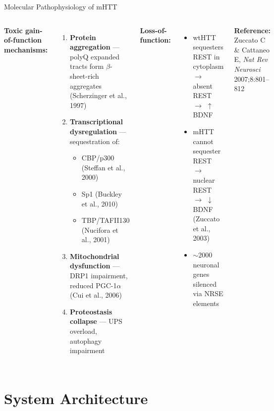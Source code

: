 \documentclass[aspectratio=169,11pt]{beamer}
\begin{document}
\begin{frame}{Molecular Pathophysiology of mHTT}
    \begin{columns}[T]
        \textbf{Toxic gain-of-function mechanisms:}
        \begin{enumerate}
            \item \textbf{Protein aggregation} --- polyQ expanded tracts form $\beta$-sheet-rich aggregates (Scherzinger et al., 1997)
            \item \textbf{Transcriptional dysregulation} --- sequestration of:
            \begin{itemize}
                \item CBP/p300 (Steffan et al., 2000)
                \item Sp1 (Buckley et al., 2010)
                \item TBP/TAFII130 (Nucifora et al., 2001)
            \end{itemize}
            \item \textbf{Mitochondrial dysfunction} --- DRP1 impairment, reduced PGC-1$\alpha$ (Cui et al., 2006)
            \item \textbf{Proteostasis collapse} --- UPS overload, autophagy impairment
        \end{enumerate}

        \textbf{Loss-of-function:}
        \begin{itemize}
            \item wtHTT sequesters REST in cytoplasm $\to$ absent REST $\to$ $\uparrow$ BDNF
            \item mHTT cannot sequester REST $\to$ nuclear REST $\to$ $\downarrow$ BDNF (Zuccato et al., 2003)
            \item $\sim$2000 neuronal genes silenced via NRSE elements
        \end{itemize}
        \vspace{0.5cm}
        \textbf{Reference:} Zuccato C \& Cattaneo E, \textit{Nat Rev Neurosci} 2007;8:801--812
    \end{columns}
\end{frame}

\section{System Architecture}
\end{document}
